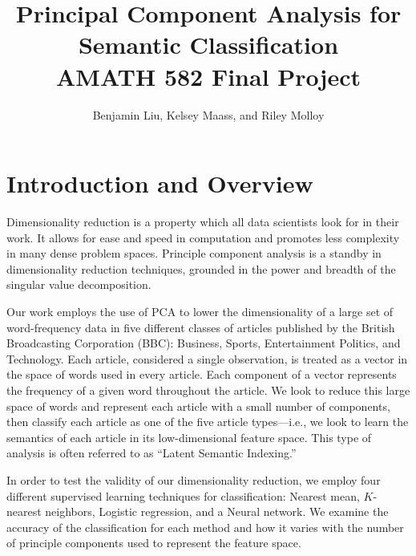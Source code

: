 \documentclass[12pt]{article}
\title{Principal Component Analysis for Semantic Classification \\ AMATH 582 Final Project}
\author{Benjamin Liu, Kelsey Maass, and Riley Molloy}
\begin{document}
\maketitle
\bigskip



\section{Introduction and Overview}
Dimensionality reduction is a property which all data scientists look for in their work. It allows for ease and speed in computation and promotes less complexity in many dense problem spaces. Principle component analysis is a standby in dimensionality reduction techniques, grounded in the power and breadth of the singular value decomposition. 

Our work employs the use of PCA to lower the dimensionality of a large set of word-frequency data in five different classes of articles published by the British Broadcasting Corporation (BBC): Business, Sports, Entertainment Politics, and Technology. Each article, considered a single observation, is treated as a vector in the space of words used in every article. Each component of a vector represents the frequency of a given word throughout the article. We look to reduce this large space of words and represent each article with a small number of components, then classify each article as one of the five article types---i.e., we look to learn the semantics of each article in its low-dimensional feature space. This type of analysis is often referred to as ``Latent Semantic Indexing.''

In order to test the validity of our dimensionality reduction, we employ four different supervised learning techniques for classification: Nearest mean, $K$-nearest neighbors, Logistic regression, and a Neural network. We examine the accuracy of the classification for each method and how it varies with the number of principle components used to represent the feature space. 
\end{document}
